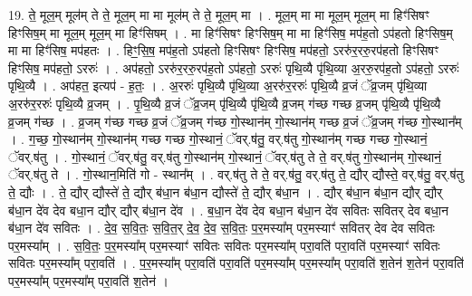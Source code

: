 \documentclass[17pt]{extarticle}
\begin{document}
19. ते॒ मूल॒म् मूल॑म् ते ते॒ मूल॒म् मा मा मूल॑म् ते ते॒ मूल॒म् मा । . मूल॒म् मा मा मूल॒म् मूल॒म् मा हिꣳ॑सिषꣳ हिꣳसिष॒म् मा मूल॒म् मूल॒म् मा हिꣳ॑सिषम् । . मा हिꣳ॑सिषꣳ हिꣳसिष॒म् मा मा हिꣳ॑सिष॒ मप॑ह॒तो ऽप॑हतो हिꣳसिष॒म् मा मा हिꣳ॑सिष॒ मप॑हतः । . हिꣳ॒॒सि॒ष॒ मप॑ह॒तो ऽप॑हतो हिꣳसिषꣳ हिꣳसिष॒ मप॑हतो॒ ऽररु॑र॒ररु॒रप॑हतो हिꣳसिषꣳ
हिꣳसिष॒ मप॑हतो॒ ऽररुः॑ । . अप॑हतो॒ ऽररु॑र॒ररु॒रप॑ह॒तो ऽप॑हतो॒ ऽररुः॑ पृथि॒व्यै पृ॑थि॒व्या अ॒ररु॒रप॑ह॒तो ऽप॑हतो॒ ऽररुः॑ पृथि॒व्यै । . अप॑हत॒ इत्यप॑ - ह॒तः॒ । . अ॒ररुः॑ पृथि॒व्यै पृ॑थि॒व्या अ॒ररु॑र॒ररुः॑ पृथि॒व्यै व्र॒जं ॅव्र॒जम् पृ॑थि॒व्या अ॒ररु॑र॒ररुः॑ पृथि॒व्यै व्र॒जम् । . पृ॒थि॒व्यै व्र॒जं ॅव्र॒जम् पृ॑थि॒व्यै पृ॑थि॒व्यै व्र॒जम् ग॑च्छ गच्छ व्र॒जम् पृ॑थि॒व्यै पृ॑थि॒व्यै व्र॒जम् ग॑च्छ । . व्र॒जम् ग॑च्छ गच्छ व्र॒जं ॅव्र॒जम् ग॑च्छ गो॒स्थान॑म् गो॒स्थान॑म् गच्छ व्र॒जं ॅव्र॒जम् ग॑च्छ गो॒स्थान᳚म् । . ग॒च्छ॒ गो॒स्थान॑म् गो॒स्थान॑म् गच्छ गच्छ गो॒स्थानं॒ ॅवर्.ष॑तु॒ वर्.ष॑तु गो॒स्थान॑म् गच्छ गच्छ गो॒स्थानं॒ ॅवर्.ष॑तु । . गो॒स्थानं॒ ॅवर्.ष॑तु॒ वर्.ष॑तु गो॒स्थान॑म् गो॒स्थानं॒ ॅवर्.ष॑तु ते ते॒ वर्.ष॑तु गो॒स्थान॑म् गो॒स्थानं॒ ॅवर्.ष॑तु ते । . गो॒स्थान॒मिति॑ गो - स्थान᳚म् । . वर्.ष॑तु ते ते॒ वर्.ष॑तु॒ वर्.ष॑तु ते॒ द्यौर् द्यौस्ते॒ वर्.ष॑तु॒ वर्.ष॑तु ते॒ द्यौः । . ते॒ द्यौर् द्यौस्ते॑ ते॒ द्यौर् ब॑धा॒न ब॑धा॒न द्यौस्ते॑ ते॒ द्यौर् ब॑धा॒न । . द्यौर् ब॑धा॒न ब॑धा॒न द्यौर् द्यौर् ब॑धा॒न दे॑व देव बधा॒न द्यौर् द्यौर् ब॑धा॒न दे॑व । . ब॒धा॒न दे॑व देव बधा॒न ब॑धा॒न दे॑व सवितः सवितर् देव बधा॒न ब॑धा॒न दे॑व सवितः । . दे॒व॒ स॒वि॒तः॒ स॒वि॒त॒र् दे॒व॒ दे॒व॒ स॒वि॒तः॒ प॒र॒मस्या᳚म् पर॒मस्याꣳ॑ सवितर् देव देव सवितः पर॒मस्या᳚म् । . स॒वि॒तः॒ प॒र॒मस्या᳚म् पर॒मस्याꣳ॑ सवितः सवितः पर॒मस्या᳚म् परा॒वति॑ परा॒वति॑ पर॒मस्याꣳ॑ सवितः सवितः पर॒मस्या᳚म् परा॒वति॑ । . प॒र॒मस्या᳚म् परा॒वति॑ परा॒वति॑ पर॒मस्या᳚म् पर॒मस्या᳚म् परा॒वति॑ श॒तेन॑ श॒तेन॑ परा॒वति॑ पर॒मस्या᳚म् पर॒मस्या᳚म् परा॒वति॑ श॒तेन॑ । \newline
\end{document}
